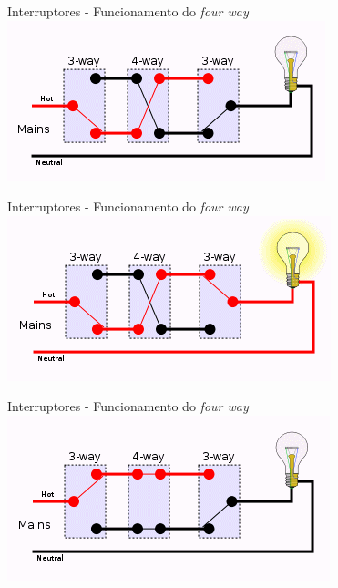 \begin{frame}{Interruptores - Funcionamento do \textit{four way}}
	\centering
	\includegraphics[width=1\linewidth]{Figuras/Ch08/fig7}
\end{frame}


\begin{frame}{Interruptores - Funcionamento do \textit{four way}}
	\centering
	\includegraphics[width=1\linewidth]{Figuras/Ch08/fig8}
\end{frame}


\begin{frame}{Interruptores - Funcionamento do \textit{four way}}
	\centering
	\includegraphics[width=1\linewidth]{Figuras/Ch08/fig9}
\end{frame}


